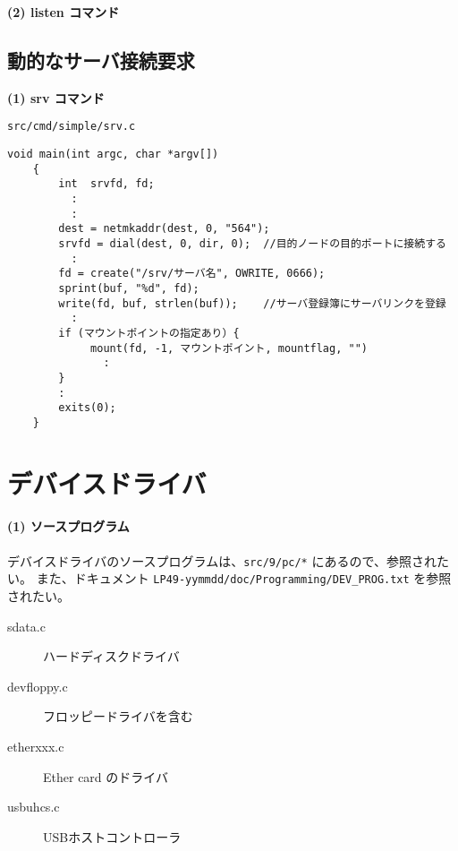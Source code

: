 {{\begin{verbatim}
\end{verbatim}
}




{\bf\flushleft  (2) listen コマンド}

\vspace{4cm}



\section{動的なサーバ接続要求}
{\bf\flushleft  (1) srv コマンド}

{\tt src/cmd/simple/srv.c}


{\small
\begin{verbatim}
void main(int argc, char *argv[])
    {
        int  srvfd, fd;
          :
          :
        dest = netmkaddr(dest, 0, "564");
        srvfd = dial(dest, 0, dir, 0);  //目的ノードの目的ポートに接続する
          :
        fd = create("/srv/サーバ名", OWRITE, 0666);
        sprint(buf, "%d", fd);
        write(fd, buf, strlen(buf));    //サーバ登録簿にサーバリンクを登録
          :
        if (マウントポイントの指定あり）{
             mount(fd, -1, マウントポイント, mountflag, "")
               :
        }
        :
        exits(0);
    }

\end{verbatim}
}




\chapter{デバイスドライバ}

\subsubsection{(1) ソースプログラム}

    デバイスドライバのソースプログラムは、{\tt src/9/pc/*} にあるので、参照されたい。
また、ドキュメント
        \verb|LP49-yymmdd/doc/Programming/DEV_PROG.txt|
   を参照されたい。

\begin{description}
\item[sdata.c]          ハードディスクドライバ
\item[devfloppy.c]      フロッピードライバを含む
\item[etherxxx.c]       Ether card のドライバ
\item[usbuhcs.c]        USBホストコントローラ
\end{description}


}
